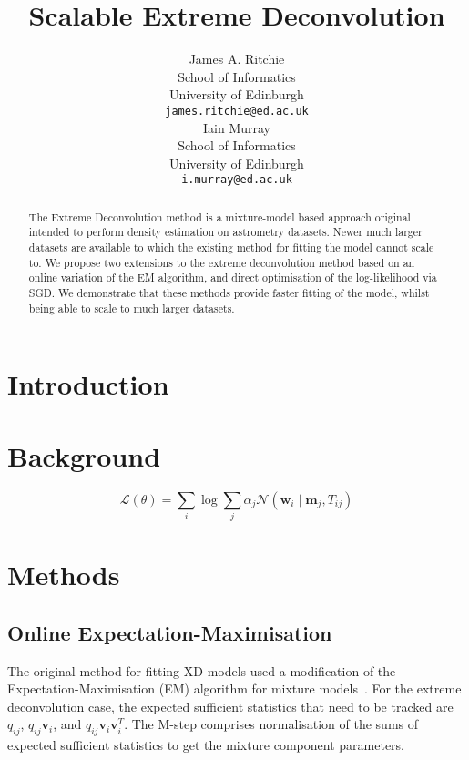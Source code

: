 \documentclass{article}
\title{Scalable Extreme Deconvolution}
\author{
  James A. Ritchie\\
  School of Informatics\\
  University of Edinburgh\\
   \texttt{james.ritchie@ed.ac.uk} \\
  \And
  Iain Murray\\
  School of Informatics\\
  University of Edinburgh\\
   \texttt{i.murray@ed.ac.uk} \\
}
\begin{document}
\maketitle

\begin{abstract}

The Extreme Deconvolution method is a mixture-model based approach original intended to perform density estimation on astrometry datasets.
Newer much larger datasets are available to which the existing method for fitting the model cannot scale to.
We propose two extensions to the extreme deconvolution method based on an online variation of the EM algorithm, and direct optimisation of the log-likelihood via SGD.
We demonstrate that these methods provide faster fitting of the model, whilst being able to scale to much larger datasets.

\end{abstract}

\section{Introduction}

\section{Background}

\begin{equation}
\mathcal{L}(\theta) = \sum_i \log \sum_j \alpha_j\mathcal{N}(\mathbf{w}_i \mid \mathbf{m}_j, T_{ij})
\end{equation}

\section{Methods}


\subsection{Online Expectation-Maximisation}
The original method for fitting XD models used a modification of the Expectation-Maximisation (EM) algorithm for mixture models~\cite{dempsterMaximumLikelihoodIncomplete1977}.
For the extreme deconvolution case, the expected sufficient statistics that need to be tracked are $q_{ij}$, $q_{ij}\mathbf{v}_i$, and $q_{ij}\mathbf{v}_i\mathbf{v}_i^T$.
The M-step comprises normalisation of the sums of expected sufficient statistics to get the mixture component parameters.
\end{document}
